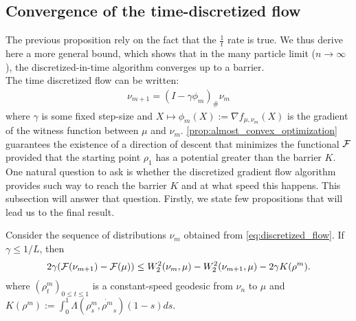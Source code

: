 

\subsection{Convergence of the time-discretized flow}

The previous proposition rely on the fact that the $\frac{1}{t}$ rate is true. We thus derive here a more general bound, which shows that in the many particle limit ($n \rightarrow \infty$), the discretized-in-time algorithm converges up to a barrier.\\



The time discretized flow can be written:
\begin{align}\label{eq:discretized_flow}
\nu_{m+1} = (I -\gamma \phi_m)_{\#}\nu_m
\end{align}
where $\gamma$ is some fixed step-size and $X \mapsto \phi_m(X):=\nabla f_{\mu, \nu_m}(X)$ is the gradient of the witness function between $\mu$ and $\nu_m$.%
\cref{prop:almost_convex_optimization} guarantees the existence of a direction of descent that minimizes the functional ${{\mathcal F}}$ provided that the starting point $\rho_1$ has a potential greater than the barrier $K$.%
One natural question to ask is whether the  discretized gradient flow algorithm provides such way to reach the barrier $K$ and at what speed this happens. This subsection will answer that question. Firstly, we state few propositions that will lead us to the final result.



\begin{proposition}\label{prop:evi}
	Consider the sequence of distributions $\nu_m$ obtained from \cref{eq:discretized_flow}. If $\gamma \leq 1/L$, then
	\begin{align}
2\gamma({{\mathcal F}}(\nu_{m+1})-{{\mathcal F}}(\mu))
\leq 
W_2^2(\nu_m,\mu)-W_2^2(\nu_{m+1},\mu)-2\gamma K(\rho^m).
\label{eq:evi}
\end{align}
where $(\rho^m_t)_{0\leq t \leq 1}$ is a constant-speed geodesic from $\nu_n$ to $\mu$ and $K(\rho^m):=\int_0^1 \Lambda(\rho^m_s,\dot{\rho^m}_s)(1-s)ds$.
\end{proposition}

